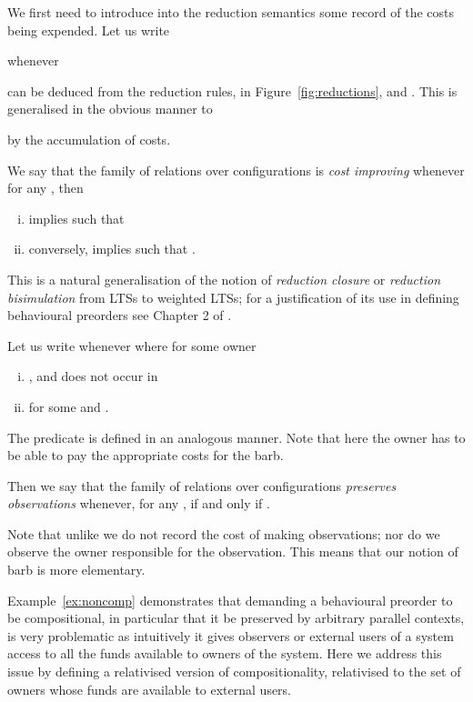\documentclass{LMCS}
\newcommand{\EndDefBox}{\null\hfill}
\newcommand{\boxHere}{\global\let\EndProof\empty\EndDefBox}
\begin{document}
We first need to introduce into the reduction semantics some record of the
costs being expended. Let us write 

whenever 

can be deduced from the reduction rules, in Figure~\ref{fig:reductions}, and 
. This is generalised in the obvious manner
to 

by the accumulation of costs. 

\begin{defi}
 We say that the family 
of relations
 over configurations
is \emph{cost improving} whenever 
 for any , then
\begin{enumerate}[(i)]
\item  implies  such that 
      

\item conversely,   implies  such that 
      .
\boxHere
\end{enumerate}
\end{defi}
\noindent
This is a natural generalisation of the notion of \emph{reduction closure}
or \emph{reduction bisimulation} from LTSs to weighted LTSs; for a justification
of its use in defining behavioural preorders see Chapter 2 of \cite{pibook}.

\begin{defi}
[Observations] 
Let us write  whenever
 where 
for some owner 
\begin{enumerate}[(i)]
\item , 
and  does not occur in 

\item  for some  and .
\end{enumerate}
The predicate  is defined in an
analogous manner.  Note that here the owner  has to be able to pay
the appropriate costs for the barb. 

Then we say that the family of relations
 over configurations \emph{preserves
  observations} whenever, for any ,  
 if and only if .
\boxHere
\end{defi}
\noindent
 Note
that unlike \cite{picost} we do not record the cost of making
observations; nor do we observe the owner responsible for the observation.
This means that our notion of barb is more elementary. 


Example~\ref{ex:noncomp} demonstrates that demanding a behavioural
preorder to be compositional, in particular that it be preserved by
arbitrary parallel contexts, is very problematic as intuitively it
gives observers or external users of a system access to all the funds available
to owners of the system. Here we address this issue by defining a relativised
version of compositionality, relativised to the set of owners whose funds are available 
to external users. 
\end{document}
